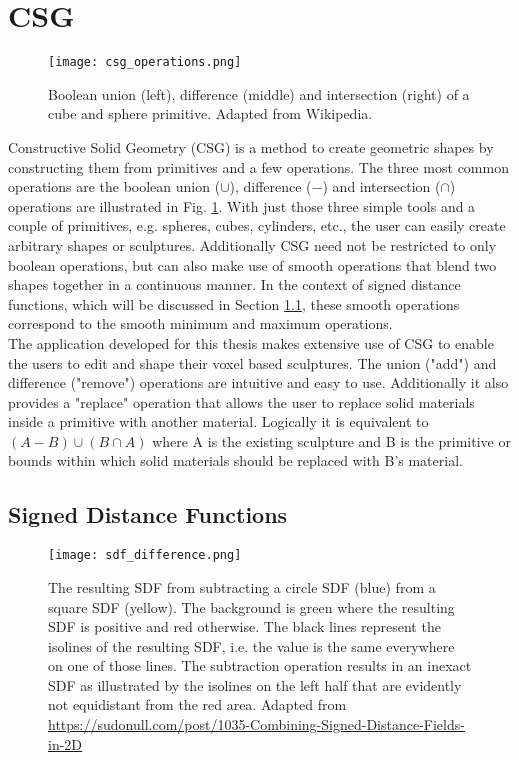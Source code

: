 \section{CSG}

\begin{figure}
\centering
\captionsetup{width=0.8\textwidth}
\texttt{[image: csg\_operations.png]}
\caption{Boolean union (left), difference (middle) and intersection (right) of a cube and sphere primitive. Adapted from Wikipedia\protect\footnotemark.}
\label{fig:csg_operations}
\end{figure}

Constructive Solid Geometry (CSG) is a method to create geometric shapes by constructing them from primitives and a few operations.
The three most common operations are the boolean union ($\cup$), difference ($-$) and intersection ($\cap$) operations are illustrated in Fig. \ref{fig:csg_operations}. With just
those three simple tools and a couple of primitives, e.g. spheres, cubes, cylinders, etc., the user can easily create arbitrary shapes or sculptures.
Additionally CSG need not be restricted to only boolean operations, but can also make use of smooth operations that blend two shapes together in a continuous
manner. In the context of signed distance functions, which will be discussed in Section \ref{sec:signed_distance_functions}, these smooth operations correspond to the smooth minimum and maximum operations.\\
The application developed for this thesis makes extensive use of CSG to enable the users to edit and shape their voxel based sculptures. The union ("add") and
difference ("remove") operations are intuitive and easy to use. Additionally it also provides a "replace" operation that allows the user to replace solid materials inside
a primitive with another material. Logically it is equivalent to $(A-B) \cup (B \cap A)$ where A is the existing sculpture and B is the primitive or bounds within
which solid materials should be replaced with B's material.

\subsection{Signed Distance Functions}
\label{sec:signed_distance_functions}

\begin{figure}
\centering
\captionsetup{width=0.8\textwidth}
\texttt{[image: sdf\_difference.png]}
\caption{The resulting SDF from subtracting a circle SDF (blue) from a square SDF (yellow). The background is green where the resulting SDF is positive and red otherwise. The black lines represent the isolines of the resulting SDF, i.e. the value is the same everywhere on one of those lines. The subtraction operation results in an inexact SDF as illustrated by the isolines on the left half that are evidently not equidistant from the red area. Adapted from \url{https://sudonull.com/post/1035-Combining-Signed-Distance-Fields-in-2D}}
\label{fig:sdf_difference}
\end{figure}


